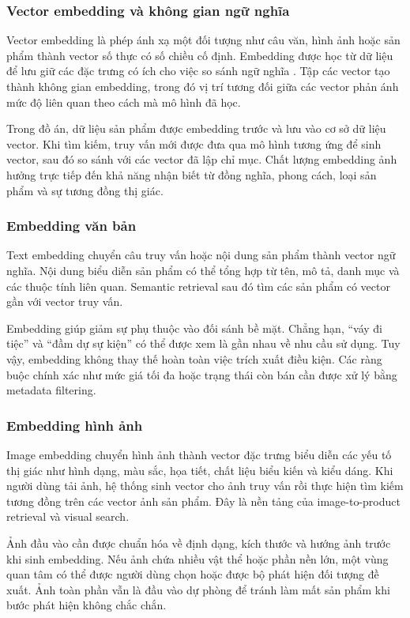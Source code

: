 \subsubsection{Vector embedding và không gian ngữ nghĩa}

Vector embedding là phép ánh xạ một đối tượng như câu văn, hình ảnh hoặc sản phẩm thành vector số thực có số chiều cố định. Embedding được học từ dữ liệu để lưu giữ các đặc trưng có ích cho việc so sánh ngữ nghĩa \parencite{pinecone_embedding}. Tập các vector tạo thành không gian embedding, trong đó vị trí tương đối giữa các vector phản ánh mức độ liên quan theo cách mà mô hình đã học.

Trong đồ án, dữ liệu sản phẩm được embedding trước và lưu vào cơ sở dữ liệu vector. Khi tìm kiếm, truy vấn mới được đưa qua mô hình tương ứng để sinh vector, sau đó so sánh với các vector đã lập chỉ mục. Chất lượng embedding ảnh hưởng trực tiếp đến khả năng nhận biết từ đồng nghĩa, phong cách, loại sản phẩm và sự tương đồng thị giác.

\subsubsection{Embedding văn bản}

Text embedding chuyển câu truy vấn hoặc nội dung sản phẩm thành vector ngữ nghĩa. Nội dung biểu diễn sản phẩm có thể tổng hợp từ tên, mô tả, danh mục và các thuộc tính liên quan. Semantic retrieval sau đó tìm các sản phẩm có vector gần với vector truy vấn.

Embedding giúp giảm sự phụ thuộc vào đối sánh bề mặt. Chẳng hạn, “váy đi tiệc” và “đầm dự sự kiện” có thể được xem là gần nhau về nhu cầu sử dụng. Tuy vậy, embedding không thay thế hoàn toàn việc trích xuất điều kiện. Các ràng buộc chính xác như mức giá tối đa hoặc trạng thái còn bán cần được xử lý bằng metadata filtering.

\subsubsection{Embedding hình ảnh}

Image embedding chuyển hình ảnh thành vector đặc trưng biểu diễn các yếu tố thị giác như hình dạng, màu sắc, họa tiết, chất liệu biểu kiến và kiểu dáng. Khi người dùng tải ảnh, hệ thống sinh vector cho ảnh truy vấn rồi thực hiện tìm kiếm tương đồng trên các vector ảnh sản phẩm. Đây là nền tảng của image-to-product retrieval và visual search.

Ảnh đầu vào cần được chuẩn hóa về định dạng, kích thước và hướng ảnh trước khi sinh embedding. Nếu ảnh chứa nhiều vật thể hoặc phần nền lớn, một vùng quan tâm có thể được người dùng chọn hoặc được bộ phát hiện đối tượng đề xuất. Ảnh toàn phần vẫn là đầu vào dự phòng để tránh làm mất sản phẩm khi bước phát hiện không chắc chắn.

